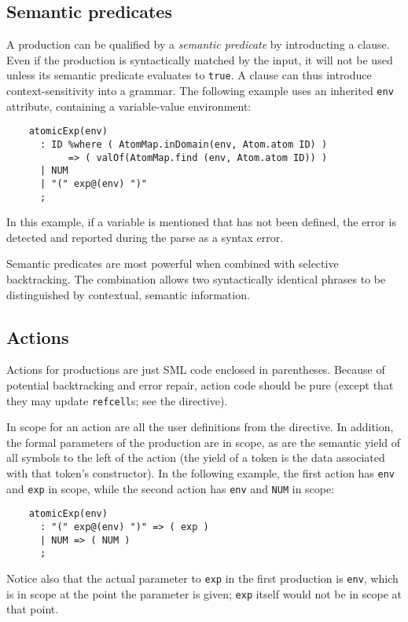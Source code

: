 \subsection{Semantic predicates}

A production can be qualified by a \emph{semantic predicate} by introducting a  clause.  Even if the production is syntactically matched by the input, it will not be used unless its semantic predicate evaluates to {\tt true}.  A  clause can thus introduce context-sensitivity into a grammar.  The following example uses an inherited {\tt env} attribute, containing a variable-value environment:
\begin{verbatim}
    atomicExp(env)
      : ID %where ( AtomMap.inDomain(env, Atom.atom ID) )
           => ( valOf(AtomMap.find (env, Atom.atom ID)) )
      | NUM
      | "(" exp@(env) ")"
      ;
\end{verbatim}
In this example, if a variable is mentioned that has not been defined, the error is detected and reported during the parse as a syntax error.

Semantic predicates are most powerful when combined with selective backtracking.  The combination allows two syntactically identical phrases to be distinguished by contextual, semantic information.

\subsection{Actions}\label{sec:antlr-actions}

Actions for productions are just SML code enclosed in parentheses.  Because of potential backtracking and error repair, action code should be pure (except that they may update \antlr{} {\tt refcell}s; see the  directive).

In scope for an action are all the user definitions from the  directive.  In addition, the formal parameters of the production are in scope, as are the semantic yield of all symbols to the left of the action (the yield of a token is the data associated with that token's constructor).  In the following example, the first action has {\tt env} and {\tt exp} in scope, while the second action has {\tt env} and {\tt NUM} in scope:
\begin{verbatim}
    atomicExp(env)
      : "(" exp@(env) ")" => ( exp )
      | NUM => ( NUM )
      ;
\end{verbatim}
Notice also that the actual parameter to {\tt exp} in the first production is {\tt env}, which is in scope at the point the parameter is given; {\tt exp} itself would not be in scope at that point.

